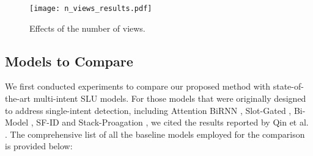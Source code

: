 \documentclass{ecai}
\begin{document}
\begin{figure*}        
	\begin{center}
		\texttt{[image: n\_views\_results.pdf]}
	\end{center}
	\vspace{-15pt}
		\caption{Effects of the number of views.}
	\label{fig:n_views}
\end{figure*}

\subsection{Models to Compare}
We first conducted experiments to compare our proposed method with state-of-the-art multi-intent SLU models. For those models that were originally designed to address single-intent detection, including Attention BiRNN \cite{liu:2016}, Slot-Gated \cite{Goo:2018}, Bi-Model \cite{wang:2018}, SF-ID \cite{Haihong:2019} and Stack-Proagation \cite{Qin:2019}, we cited the results reported by Qin et al. \cite{qin:2020}. The comprehensive list of all the baseline models employed for the comparison is provided below:
\end{document}
